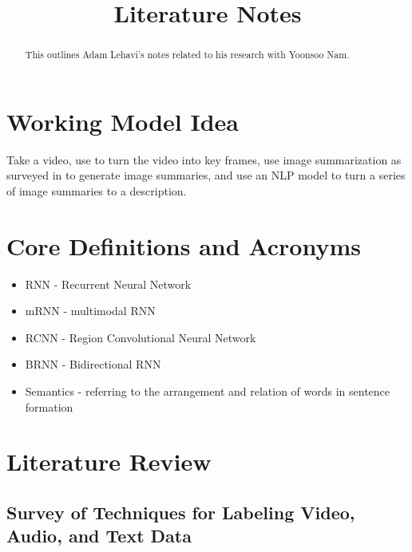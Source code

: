 \documentclass[conference]{IEEEtran}
\begin{document}
\title{Literature Notes}

\author{
}

\maketitle

\begin{abstract}
This outlines Adam Lehavi's notes related to his research with Yoonsoo Nam.
\end{abstract}

\section{Working Model Idea}
Take a video, use \cite{4604096} to turn the video into key frames, use image summarization as surveyed in \cite{bernardi2016automatic} to generate image summaries, and use an NLP model to turn a series of image summaries to a description.

\section{Core Definitions and Acronyms}
\begin{itemize}
    \item RNN - Recurrent Neural Network
    \item mRNN - multimodal RNN
    \item RCNN - Region Convolutional Neural Network
    \item BRNN - Bidirectional RNN
    \item Semantics - referring to the arrangement and relation of words in sentence formation
\end{itemize}

\section{Literature Review}
\subsection{Survey of Techniques for Labeling Video, Audio, and Text Data}
\end{document}
